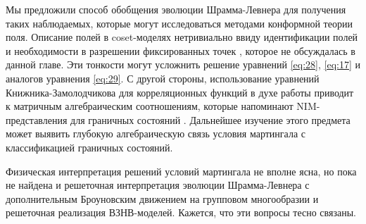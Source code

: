 Мы предложили способ обобщения эволюции Шрамма-Левнера для получения таких наблюдаемых, которые могут исследоваться методами конформной теории поля. Описание полей в coset-моделях нетривиально ввиду идентификации полей \cite{schellekens1990field} и необходимости в разрешении фиксированных точек \cite{Fuchs:1996dd,fuchs1996resolution}, которое не обсуждалась в данной главе. Эти тонкости могут усложнить решение уравнений  \eqref{eq:28}, \eqref{eq:17} и аналогов уравнения \eqref{eq:29}. С другой стороны, использование уравнений Книжника-Замолодчикова  \cite{kogan1997knizhnik} для корреляционных функций в духе работы \cite{alekseev2010sle} приводит к матричным алгебраическим соотношениям, которые напоминают NIM-представления для граничных состояний \cite{ishikawa2003novel}. Дальнейшее изучение этого предмета может выявить глубокую алгебраическую связь условия мартингала с классификацией граничных состояний.

Физическая интерпретация решений условий мартингала не вполне ясна, но пока не найдена и решеточная интерпретация эволюции Шрамма-Левнера с дополнительным Броуновским движением на групповом многообразии \cite{bettelheim2005stochastic} и решеточная реализация ВЗНВ-моделей. Кажется, что эти вопросы тесно связаны.


